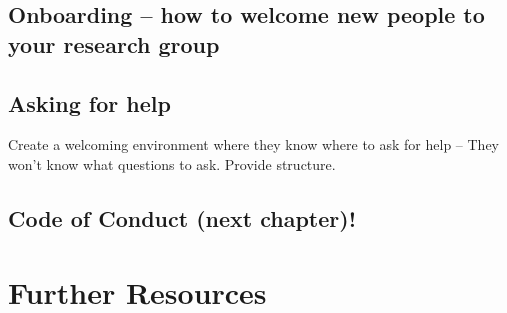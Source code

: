 \documentclass[
  letterpaper,
  DIV=11,
  numbers=noendperiod]{scrreprt}
\begin{document}
\hypertarget{onboarding-how-to-welcome-new-people-to-your-research-group}{%
\subsection{Onboarding -- how to welcome new people to your research
group}\label{onboarding-how-to-welcome-new-people-to-your-research-group}}

\hypertarget{asking-for-help}{%
\subsection{Asking for help}\label{asking-for-help}}

Create a welcoming environment where they know where to ask for help --
They won't know what questions to ask. Provide structure.

\hypertarget{code-of-conduct-next-chapter}{%
\subsection{Code of Conduct (next
chapter)!}\label{code-of-conduct-next-chapter}}

\hypertarget{further-resources-1}{%
\section{Further Resources}\label{further-resources-1}}
\end{document}

